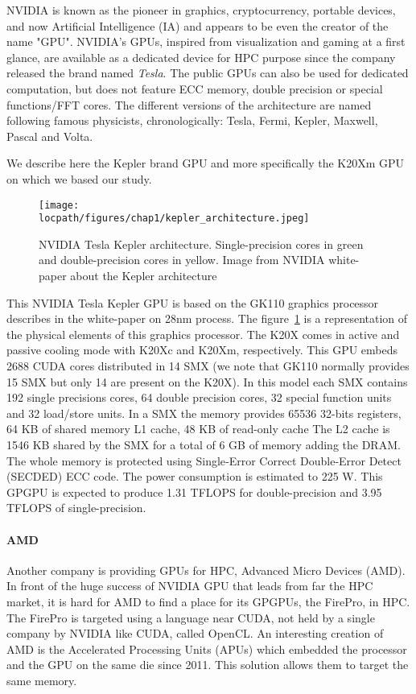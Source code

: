 NVIDIA is known as the pioneer in graphics, cryptocurrency, portable devices, and now Artificial Intelligence (IA) and appears to be even the creator of the name "GPU".
NVIDIA's GPUs, inspired from visualization and gaming at a first glance, are available as a dedicated device for HPC purpose since the company released the brand named \textit{Tesla}. 
The public GPUs can also be used for dedicated computation, but does not feature ECC memory, double precision or special functions/FFT cores. 
The different versions of the architecture are named following famous physicists, chronologically: Tesla, Fermi, Kepler, Maxwell, Pascal and Volta.

We describe here the Kepler brand GPU and more specifically the K20Xm GPU on which we based our study. 
\begin{figure}
\centering
\texttt{[image: \\locpath/figures/chap1/kepler\_architecture.jpeg]}
\caption[NVIDIA Tesla Kepler architecture]{NVIDIA Tesla Kepler architecture. Single-precision cores in green and double-precision cores in yellow. Image from NVIDIA white-paper about the Kepler architecture\cite{nvidia2012nvidias}}
\label{fig:2_HARD:kepler_arch}
\end{figure}
This NVIDIA Tesla Kepler GPU is based on the GK110 graphics processor describes in the white-paper\cite{nvidia2012nvidias} on 28nm process.
The figure~\ref{fig:2_HARD:kepler_arch} is a representation of the physical elements of this graphics processor. 
The K20X comes in active and passive cooling mode with K20Xc and K20Xm, respectively.
This GPU embeds 2688 CUDA cores distributed in 14 SMX (we note that GK110 normally provides 15 SMX but only 14 are present on the K20X).
In this model each SMX contains 192 single precisions cores, 64 double precision cores, 32 special function units and 32 load/store units.
In a SMX the memory provides 65536 32-bits registers, 64 KB of shared memory L1 cache, 48 KB of read-only cache
The L2 cache is 1546 KB shared by the SMX for a total of 6 GB of memory adding the DRAM.
The whole memory is protected using Single‐Error Correct Double‐Error Detect (SECDED) ECC code.
The power consumption is estimated to 225 W.
This GPGPU is expected to produce 1.31 TFLOPS for double-precision and 3.95 TFLOPS of single-precision.

\paragraph{AMD}
Another company is providing GPUs for HPC, Advanced Micro Devices (AMD). 
In front of the huge success of NVIDIA GPU that leads from far the HPC market, it is hard for AMD to find a place for its GPGPUs, the FirePro, in HPC. 
The FirePro is targeted using a language near CUDA, not held by a single company by NVIDIA like CUDA, called OpenCL. 
An interesting creation of AMD is the Accelerated Processing Units (APUs) which embedded the processor and the GPU on the same die since 2011. 
This solution allows them to target the same memory. 

